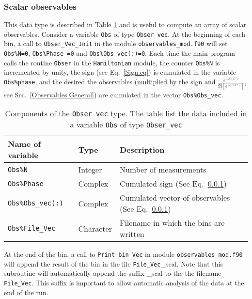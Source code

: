 \subsubsection{Scalar observables}
This data type  is described in Table  \ref{table:Obser_vec} and  is useful to compute an array of  scalar observables.   Consider  a variable \texttt{Obs} of type  \texttt{Obser\_vec}.  At the beginning of each bin,  a call to  \texttt{Obser\_Vec\_Init} in the module \texttt{observables\_mod.f90}  will  set   \texttt{Obs\%N=0},   \texttt{Obs\%Phase =0}  and  \texttt{Obs\%Obs\_vec(:)=0}.  Each time the main  program calls the routine \texttt{Obser}  in the  \texttt{Hamiltonian} module,  the counter \texttt{Obs\%N}   is incremented by unity,   the sign  (see Eq.~\ref{Sign.eq}) is cumulated in the  variable \texttt{Obs\%phase},  and the desired  the observables (multiplied by the sign and   $\frac{e^{-S(C)}} {\Re \left[e^{-S(C)} \right]}$, see Sec.~\ref{Observables.General})  are cumulated in the vector \texttt{Obs\%Obs\_vec}.  
\begin{table}[h]
   \begin{tabular}{l ll }
    Name of variable  &  Type      &  Description \\\hline
    \texttt{Obs\%N}                       &  Integer        &   Number of measurements  \\
    \texttt{Obs\%Phase}               &  Complex     &    Cumulated sign (See Eq.~\ref{})  \\
    \texttt{Obs\%Obs\_vec(:)}        & Complex      &    Cumulated vector of observables (See  Eq.~\ref{}) \\
     \texttt{Obs\%File\_Vec}           &  Character    &    Filename  in which the bins are written  
   \end{tabular}
   \caption{Components of the \texttt{Obser\_vec}  type.  The table list the data included in a variable  \texttt{Obs}  of type \texttt{Obser\_vec} 
      \label{table:Obser_vec}}
\end{table}
At the end of the bin, a call to  \texttt{Print\_bin\_Vec}   in  module \texttt{observables\_mod.f90}  will  append the result of the bin in the file  \texttt{File\_Vec}\_scal.  Note that this subroutine will automatically append the suffix  \_scal 
to the the filename \texttt{File\_Vec}.    This suffix  is important to allow automatic analysis of the data at the end of the run. 

